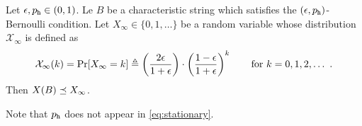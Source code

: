   \begin{lemma}\label{lemma:rho-stationary}
    Let $\epsilon, p_{\mathtt{h}} \in (0,1)$. 
    Le $B$ be a characteristic string which satisfies the $(\epsilon, p_{\mathtt{h}})$-Bernoulli condition. 
    Let $X_\infty \in \{0, 1, \ldots\}$ be a random variable 
    whose distribution $\mathcal{X}_\infty$ is defined as 
      \begin{equation}
        \label{eq:stationary}
        \mathcal{X}_\infty(k) 
          = \Pr[X_\infty = k] 
          \defeq \left(\frac{2\epsilon}{1+\epsilon}\right)\cdot \left(\frac{1-\epsilon}{1 + \epsilon}\right)^k
          \qquad \text{for $k = 0, 1, 2, \ldots$}\ 
        \,.
      \end{equation}
    Then $X(B) \preceq X_\infty$.
  \end{lemma}
  Note that $p_{\mathtt{h}}$ does not appear in \eqref{eq:stationary}.

